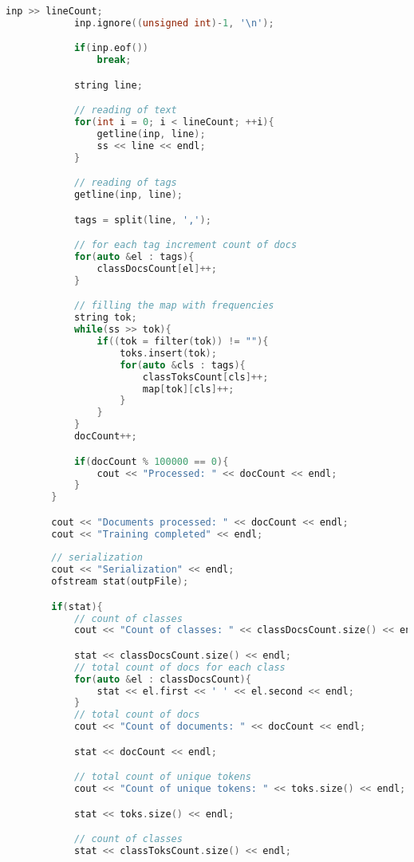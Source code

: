 \documentclass[12pt,a4paper]{scrartcl}
\begin{document}
\begin{lstlisting}[language=C++, basicstyle=\scriptsize]
            inp >> lineCount;
            inp.ignore((unsigned int)-1, '\n');

            if(inp.eof())
                break;

            string line;

            // reading of text
            for(int i = 0; i < lineCount; ++i){
                getline(inp, line);
                ss << line << endl;
            }

            // reading of tags
            getline(inp, line);

            tags = split(line, ',');

            // for each tag increment count of docs
            for(auto &el : tags){
                classDocsCount[el]++;
            }

            // filling the map with frequencies
            string tok;
            while(ss >> tok){
                if((tok = filter(tok)) != ""){
                    toks.insert(tok);
                    for(auto &cls : tags){
                        classToksCount[cls]++;
                        map[tok][cls]++;
                    }
                }
            }
            docCount++;

            if(docCount % 100000 == 0){
                cout << "Processed: " << docCount << endl;
            }
        }

        cout << "Documents processed: " << docCount << endl;
        cout << "Training completed" << endl;
        
        // serialization
        cout << "Serialization" << endl;
        ofstream stat(outpFile);

        if(stat){
            // count of classes
            cout << "Count of classes: " << classDocsCount.size() << endl;

            stat << classDocsCount.size() << endl;
            // total count of docs for each class
            for(auto &el : classDocsCount){
                stat << el.first << ' ' << el.second << endl;
            }
            // total count of docs
            cout << "Count of documents: " << docCount << endl;

            stat << docCount << endl;

            // total count of unique tokens
            cout << "Count of unique tokens: " << toks.size() << endl;

            stat << toks.size() << endl;

            // count of classes
            stat << classToksCount.size() << endl;


\end{lstlisting}
\end{document}
